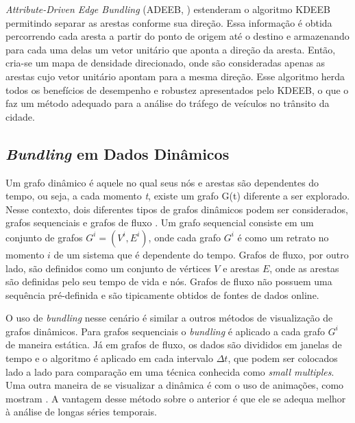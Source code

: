 
  {\emph{Attribute-Driven Edge Bundling} (ADEEB,
\citet{ZegarraFlores2016}) estenderam o algoritmo KDEEB permitindo separar as
arestas conforme sua direção. Essa informação é obtida percorrendo cada aresta
a partir do ponto de origem até o destino e armazenando para cada uma delas um
vetor unitário que aponta a direção da aresta. Então, cria-se um mapa de
densidade direcionado, onde são consideradas apenas as arestas cujo vetor
unitário apontam para a mesma direção.  Esse algoritmo herda todos os
benefícios de desempenho e robustez apresentados pelo KDEEB, o que o faz um
método adequado para a análise do tráfego de veículos no trânsito da cidade.

\subsection{\emph{Bundling} em Dados Dinâmicos}

  Um grafo dinâmico é aquele no qual seus nós e arestas são dependentes do
tempo, ou seja, a cada momento \emph{t}, existe um grafo G(t) diferente a ser
explorado. Nesse contexto, dois diferentes tipos de grafos dinâmicos podem ser
considerados, grafos sequenciais e grafos de fluxo \citep{Hurter2013}. Um
grafo sequencial consiste em um conjunto de grafos $G^i = (V^i, E^i)$, onde
cada grafo $G^i$ é como um retrato no momento $i$ de um sistema que é
dependente do tempo. Grafos de fluxo, por outro lado, são definidos como um
conjunto de vértices $V$ e arestas $E$, onde as arestas são definidas pelo seu
tempo de vida e nós. Grafos de fluxo não possuem uma sequência pré-definida e
são tipicamente obtidos de fontes de dados online.

  O uso de \emph{bundling} nesse cenário é similar a outros métodos de
visualização de grafos dinâmicos. Para grafos sequenciais o \emph{bundling} é
aplicado a cada grafo $G^i$ de maneira estática. Já em grafos de fluxo, os
dados são divididos em janelas de tempo e o algoritmo é aplicado em cada
intervalo $\Delta t$, que podem ser colocados lado a lado para comparação em
uma técnica conhecida como \emph{small multiples}. Uma outra maneira de se
visualizar a dinâmica é com o uso de animações, como mostram
\citet{Hurter2014}. A vantagem desse método sobre o anterior é que ele se
adequa melhor à análise de longas séries temporais.

}
